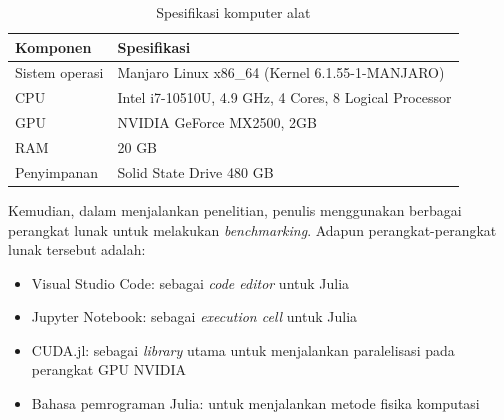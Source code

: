 \begin{table}[H]
  \centering
  \caption{Spesifikasi komputer alat}
  \begin{tabular}{|M{5cm}|M{8cm}|}
    \hline
    \textbf{Komponen} & \textbf{Spesifikasi}                                   \\
    \hline
    Sistem operasi    & Manjaro Linux x86\_64 (Kernel 6.1.55-1-MANJARO)        \\
    \hline
    CPU               & Intel i7-10510U, 4.9 GHz, 4 Cores, 8 Logical Processor \\
    \hline
    GPU               & NVIDIA GeForce MX2500, 2GB                             \\
    \hline
    RAM               & 20 GB                                                  \\
    \hline
    Penyimpanan       & Solid State Drive 480 GB                               \\
    \hline
  \end{tabular}
\end{table}

Kemudian, dalam menjalankan penelitian, penulis menggunakan berbagai perangkat
lunak untuk melakukan \emph{benchmarking}. Adapun perangkat-perangkat lunak
tersebut adalah:
\begin{itemize}
  \item Visual Studio Code: sebagai \emph{code editor} untuk Julia

  \item Jupyter Notebook: sebagai \emph{execution cell} untuk Julia

  \item CUDA.jl: sebagai \emph{library} utama untuk menjalankan paralelisasi pada
        perangkat GPU NVIDIA

  \item Bahasa pemrograman Julia: untuk menjalankan metode fisika komputasi

\end{itemize}


